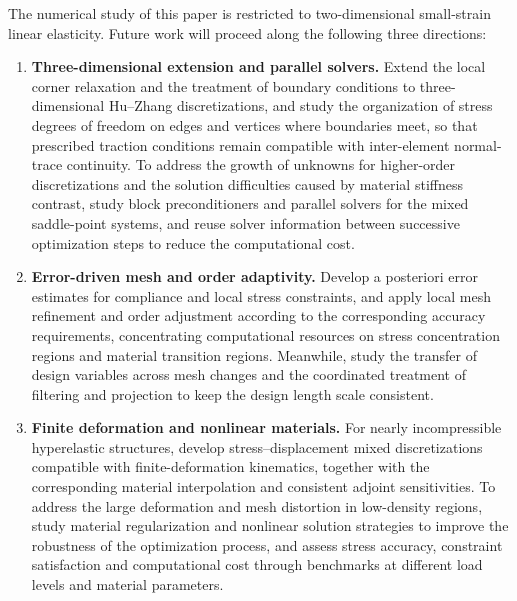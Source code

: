 The numerical study of this paper is restricted to two-dimensional small-strain linear elasticity. Future work will proceed along the following three directions:
\begin{enumerate}
    \item \textbf{Three-dimensional extension and parallel solvers.} Extend the local corner relaxation and the treatment of boundary conditions to three-dimensional Hu--Zhang discretizations, and study the organization of stress degrees of freedom on edges and vertices where boundaries meet, so that prescribed traction conditions remain compatible with inter-element normal-trace continuity. To address the growth of unknowns for higher-order discretizations and the solution difficulties caused by material stiffness contrast, study block preconditioners and parallel solvers for the mixed saddle-point systems, and reuse solver information between successive optimization steps to reduce the computational cost.
    \item \textbf{Error-driven mesh and order adaptivity.} Develop a posteriori error estimates for compliance and local stress constraints, and apply local mesh refinement and order adjustment according to the corresponding accuracy requirements, concentrating computational resources on stress concentration regions and material transition regions. Meanwhile, study the transfer of design variables across mesh changes and the coordinated treatment of filtering and projection to keep the design length scale consistent.
    \item \textbf{Finite deformation and nonlinear materials.} For nearly incompressible hyperelastic structures, develop stress--displacement mixed discretizations compatible with finite-deformation kinematics, together with the corresponding material interpolation and consistent adjoint sensitivities. To address the large deformation and mesh distortion in low-density regions, study material regularization and nonlinear solution strategies to improve the robustness of the optimization process, and assess stress accuracy, constraint satisfaction and computational cost through benchmarks at different load levels and material parameters.
\end{enumerate}
